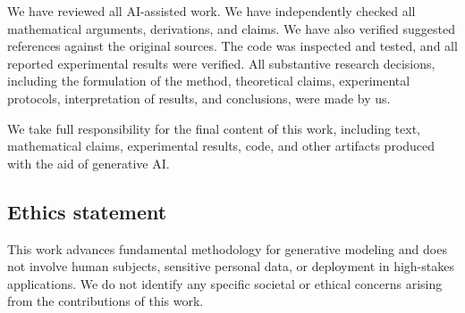 \documentclass{article} %
\numberwithin{equation}{section}
\begin{document}
We have reviewed all AI-assisted work. We have independently checked all  mathematical arguments, derivations, and claims. We have also verified suggested references against the original sources. The code was inspected and tested, and all reported experimental results were  verified.  All substantive research decisions, including the formulation of the method, theoretical claims, experimental protocols, interpretation of results, and conclusions, were made by us.

We take full responsibility for the final content of this work, including text, mathematical claims, experimental results, code, and other artifacts produced with the aid of generative AI.



\subsection*{Ethics statement}
This work advances fundamental methodology for generative modeling and does not involve human subjects, sensitive personal data, or deployment in high-stakes applications. We do not identify any specific societal or ethical concerns arising from the contributions of this work.

\end{document}
